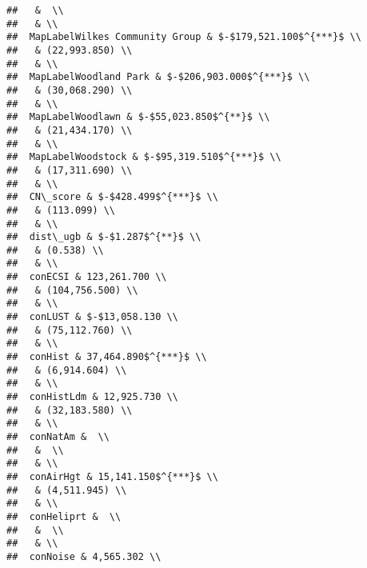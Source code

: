 \documentclass[]{article}
\begin{document}
\begin{verbatim}
##   &  \\ 
##   & \\ 
##  MapLabelWilkes Community Group & $-$179,521.100$^{***}$ \\ 
##   & (22,993.850) \\ 
##   & \\ 
##  MapLabelWoodland Park & $-$206,903.000$^{***}$ \\ 
##   & (30,068.290) \\ 
##   & \\ 
##  MapLabelWoodlawn & $-$55,023.850$^{**}$ \\ 
##   & (21,434.170) \\ 
##   & \\ 
##  MapLabelWoodstock & $-$95,319.510$^{***}$ \\ 
##   & (17,311.690) \\ 
##   & \\ 
##  CN\_score & $-$428.499$^{***}$ \\ 
##   & (113.099) \\ 
##   & \\ 
##  dist\_ugb & $-$1.287$^{**}$ \\ 
##   & (0.538) \\ 
##   & \\ 
##  conECSI & 123,261.700 \\ 
##   & (104,756.500) \\ 
##   & \\ 
##  conLUST & $-$13,058.130 \\ 
##   & (75,112.760) \\ 
##   & \\ 
##  conHist & 37,464.890$^{***}$ \\ 
##   & (6,914.604) \\ 
##   & \\ 
##  conHistLdm & 12,925.730 \\ 
##   & (32,183.580) \\ 
##   & \\ 
##  conNatAm &  \\ 
##   &  \\ 
##   & \\ 
##  conAirHgt & 15,141.150$^{***}$ \\ 
##   & (4,511.945) \\ 
##   & \\ 
##  conHeliprt &  \\ 
##   &  \\ 
##   & \\ 
##  conNoise & 4,565.302 \\ 

\end{verbatim}
\end{document}
